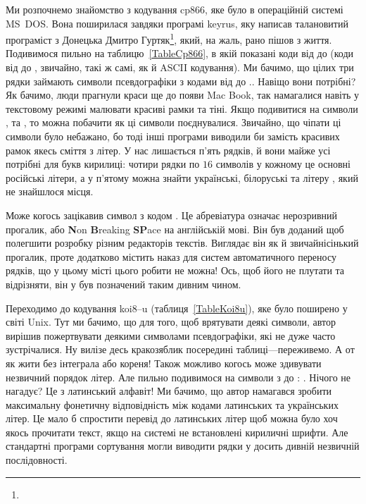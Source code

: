 Ми розпочнемо знайомство з кодування cp866, яке було в операційній системі MS~DOS.
Вона поширилася завдяки програмі keyrus, яку написав талановитий програміст з Донецька Дмитро Гуртяк\footnote{\Gurtyak}, який, на жаль, рано пішов з життя.
Подивимося пильно на таблицю~\ref{TableCp866}, в якій показані коди від  до  (коди від  до , звичайно, такі ж самі, як й ASCII кодування).
Ми бачимо, що цілих три рядки займають символи псевдографіки з кодами від  до ..
Навіщо вони потрібні?
Як бачимо, люди прагнули краси ще до появи Mac Book, так намагалися навіть у текстовому режимі малювати красиві рамки та тіні.
Якщо подивитися на символи ,  та , то можна побачити як ці символи поєднувалися.
Звичайно, що чіпати ці символи було небажано, бо тоді інші програми виводили би замість красивих рамок якесь сміття з літер.
У нас лишається п'ять рядків, й вони майже усі потрібні для букв кирилиці: чотири рядки по $16$ символів у кожному це основні російські літери, а у п'ятому можна знайти українські, білоруські та літеру , який не знайшлося місця.

Може когось зацікавив символ  з кодом .
Це абревіатура означає нерозривний прогалик, або \textbf{N}on \textbf{B}reaking \textbf{SP}ace на англійській мові.
Він був доданий щоб полегшити розробку різним редакторів текстів.
Виглядає він як й звичайнісінький прогалик, проте додатково містить наказ для систем автоматичного переносу рядків, що у цьому місті цього робити не можна!
Ось, щоб його не плутати та відрізняти, він у був позначений таким дивним чином.

Переходимо до кодування koi8--u (таблиця~\ref{TableKoi8u}), яке було поширено у світі Unix.
Тут ми бачимо, що для того, щоб врятувати деякі символи, автор вирішив пожертвувати деякими символами псевдографіки, які не дуже часто зустрічалися.
Ну вилізе десь кракозяблик посередині таблиці---переживемо.
А от як жити без інтеграла або кореня!
Також можливо когось може здивувати незвичний порядок літер.
Але пильно подивимося на символи з  до : .
Нічого не нагадує?
Це з латинський алфавіт!
Ми бачимо, що автор намагався зробити максимальну фонетичну відповідність між кодами латинських та українських літер.
Це мало б спростити перевід до латинських літер щоб можна було хоч якось прочитати текст, якщо на системі не встановлені кириличні шрифти.
Але стандартні програми сортування могли виводити рядки у досить дивній незвичній послідовності.

